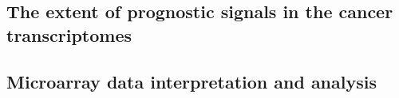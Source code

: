 \subsection{The extent of prognostic signals in the cancer transcriptomes}
\label{sec:discussion-prognostic-microarrays}

\subsection{Microarray data interpretation and analysis}
\label{sec:discussion-interpretation-microarrays}


\clearpage


